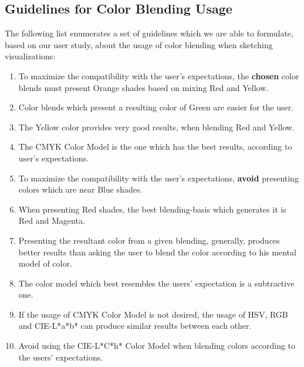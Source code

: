 \subsection{Guidelines for Color Blending Usage}
%
The following list enumerates a set of guidelines which we are able to formulate, based on our user study,
about the usage of color blending when sketching visualizations:
%
\begin{enumerate}
  \setlength\itemsep{0.01em}
  \item To maximize the compatibility with the user's expectations, the \textbf{chosen} color blends must present Orange shades based on mixing Red and Yellow.
  \item Color blends which present a resulting color of Green are easier for the user.
  \item The Yellow color provides very good results, when blending Red and Yellow.
  \item The CMYK Color Model is the one which has the best results, according to user's expectations.
  \item To maximize the compatibility with the user's expectations, \textbf{avoid} presenting colors which are near Blue shades.
  \item When presenting Red shades, the best blending-basis which generates it is Red and Magenta.
  \item Presenting the resultant color from a given blending, generally, produces better results than asking the user to blend the color according to his mental model of color.
  \item The color model which best resembles the users' expectation is a subtractive one.
  \item If the usage of CMYK Color Model is not desired, the usage of HSV, RGB and CIE-L*a*b* can produce similar results between each other.
  \item Avoid using the CIE-L*C*h* Color Model when blending colors according to the users' expectations.
\end{enumerate}
